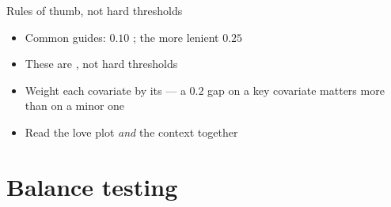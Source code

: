 \documentclass[table, xcolor = {dvipsnames}, 9pt]{beamer}
\theoremstyle{plain}
\newcommand{\mh}[1]{{\color{magenta}{#1}}}
\begin{document}
\begin{frame}[t]{Rules of thumb, not hard thresholds}
\vfill
\begin{itemize} \vfill
\item Common guides: $0.10$ \citep{austin2009}; the more lenient $0.25$ \citep{stuart2010} \vfill
\item These are \mh{heuristics}, not hard thresholds \vfill
\item Weight each covariate by its \mh{importance} --- a $0.2$ gap on a key covariate matters more than on a minor one \vfill
\item Read the love plot \emph{and} the context together \vfill
\end{itemize} \vfill
\end{frame}
\section{Balance testing}
\end{document}
